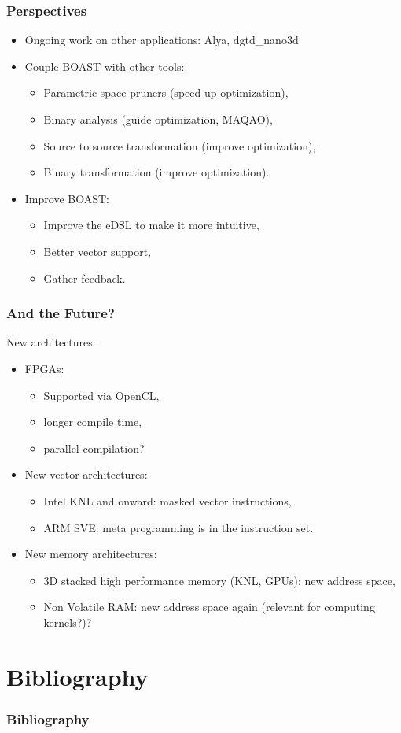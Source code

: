 \documentclass{beamer}
\begin{document}
\begin{frame}
  \frametitle{Perspectives}
  \begin{itemize}
    \item Ongoing work on other applications: Alya, dgtd\_nano3d
    \item Couple BOAST with other tools:
    \begin{itemize}
      \item Parametric space pruners (speed up optimization),
      \item Binary analysis (guide optimization, MAQAO),
      \item Source to source transformation (improve optimization),
      \item Binary transformation (improve optimization).
    \end{itemize}
    \item Improve BOAST:
    \begin{itemize}
      \item Improve the eDSL to make it more intuitive,
      \item Better vector support,
      \item Gather feedback.
    \end{itemize}
  \end{itemize}
\end{frame}


\begin{frame}
  \frametitle{And the Future?}
  New architectures:
  \begin{itemize}
    \item FPGAs:
    \begin{itemize}
      \item Supported via OpenCL,
      \item longer compile time,
      \item parallel compilation?
    \end{itemize}
    \item New vector architectures:
    \begin{itemize}
      \item Intel KNL and onward: masked vector instructions,
      \item ARM SVE: meta programming is in the instruction set.
    \end{itemize}
    \item New memory architectures:
    \begin{itemize}
      \item 3D stacked high performance memory (KNL, GPUs): new address space,
      \item Non Volatile RAM: new address space again (relevant for computing kernels?)?
    \end{itemize}
  \end{itemize}
\end{frame}
\section{Bibliography}

\begin{frame}[shrink=50]
  \frametitle{Bibliography}
  
\end{frame}
\end{document}
